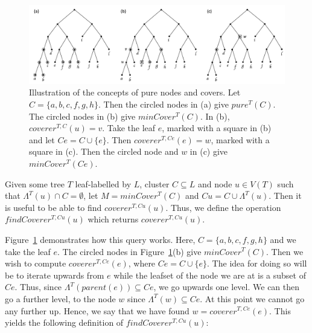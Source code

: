 \documentclass[final,1p,times]{elsarticle}
\newcommand{\leafset}{\Lambda}
\begin{document}
    \begin{figure}[ht]
        \includegraphics[width=\textwidth]{mincoverrecursive}
        \centering
        \caption[Pure nodes and covers]{Illustration of the concepts of pure nodes and covers. Let $C = \{a, b, c, f, g, h\}$. Then the circled nodes in (a) give $pure^{T}(C)$. The circled nodes in (b) give $minCover^{T}(C)$. In (b), $coverer^{T, C}(u) = v$. Take the leaf $e$, marked with a square in (b) and let $Ce = C \cup \{e\}$. Then $coverer^{T, Ce}(e) = w$, marked with a square in (c). Then the circled node and $w$ in (c) give $minCover^{T}(Ce)$.}
        \label{fig:mincoverrecursive}
    \end{figure}

    Given some tree $T$ leaf-labelled by $L$, cluster $C \subseteq L$ and node $u \in V(T)$ such that $\leafset^{T}(u) \cap C = \emptyset$, let $M = minCover^{T}(C)$ and $Cu = C \cup \leafset^{T}(u)$. Then it is useful to be able to find $coverer^{T, Cu}(u)$. Thus, we define the operation $findCoverer^{T, Cu}(u)$ which returns $coverer^{T, Cu}(u)$.

    Figure~\ref{fig:mincoverrecursive} demonstrates how this query works. Here, $C = \{a, b, c, f, g, h\}$ and we take the leaf $e$. The circled nodes in Figure~\ref{fig:mincoverrecursive}(b) give $minCover^{T}(C)$. Then we wish to compute $coverer^{T, Ce}(e)$, where $Ce = C \cup \{e\}$. The idea for doing so will be to iterate upwards from $e$ while the leafset of the node we are at is a subset of $Ce$. Thus, since $\leafset^{T}(parent(e)) \subseteq Ce$, we go upwards one level. We can then go a further  level, to the node $w$ since $\leafset^{T}(w) \subseteq Ce$. At this point we cannot go any further up. Hence, we say that we have found $w = coverer^{T, Ce}(e)$. This yields the following definition of $findCoverer^{T, Cu}(u)$:
    \newline
\end{document}
